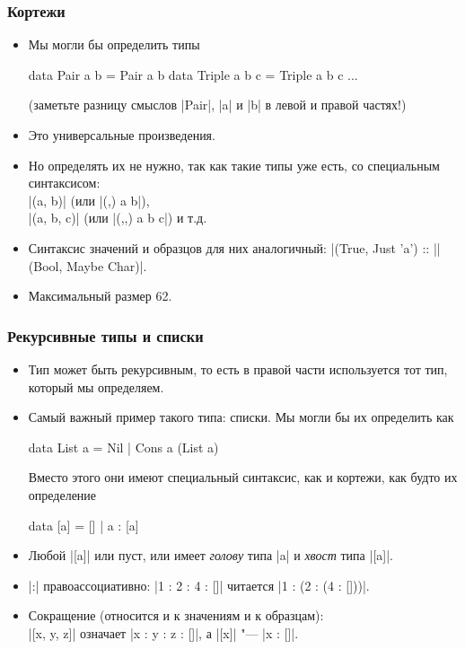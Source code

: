 \documentclass[10pt]{beamer}
\begin{document}
\begin{frame}[fragile]
  \frametitle{Кортежи}
  \begin{itemize}
    \item Мы могли бы определить типы
          \begin{haskell}
            data Pair a b = Pair a b
            data Triple a b c = Triple a b c
            ...
          \end{haskell}
          (заметьте разницу смыслов \haskinline|Pair|, \haskinline|a| и \haskinline|b| в левой и правой частях!)
    \item Это универсальные произведения.
          \pause
    \item Но определять их не нужно, так как такие типы уже есть, со специальным синтаксисом:\\
          \haskinline|(a, b)| (или \haskinline|(,) a b|),\\ \haskinline|(a, b, c)| (или \haskinline|(,,) a b c|) и т.д.
    \item Синтаксис значений и образцов для них аналогичный:
          \haskinline|(True, Just 'a') :: |\pause\haskinline|(Bool, Maybe Char)|.
    \item Максимальный размер 62.
  \end{itemize}
\end{frame}

\begin{frame}[fragile]
  \frametitle{Рекурсивные типы и списки}
  \begin{itemize}
    \item Тип может быть рекурсивным, то есть в правой части используется тот тип, который мы определяем.
    \item Самый важный пример такого типа: списки.
          Мы могли бы их определить как
          \begin{haskell}
            data List a = Nil | Cons a (List a)
          \end{haskell}
          Вместо этого они имеют специальный синтаксис, как и кортежи, как будто их определение
          \begin{haskell}
            data [a] = [] | a : [a]
          \end{haskell}
    \item Любой \haskinline|[a]| или пуст, или имеет \emph{голову} типа \haskinline|a| и \emph{хвост} типа \haskinline|[a]|.
    \item \haskinline|:| правоассоциативно: \haskinline|1 : 2 : 4 : []| читается \haskinline|1 : (2 : (4 : []))|.
    \item Сокращение (относится и к значениям и к образцам):\\
          \haskinline|[x, y, z]| означает \haskinline|x : y : z : []|, а \haskinline|[x]| "--- \haskinline|x : []|.
  \end{itemize}
\end{frame}
\end{document}
